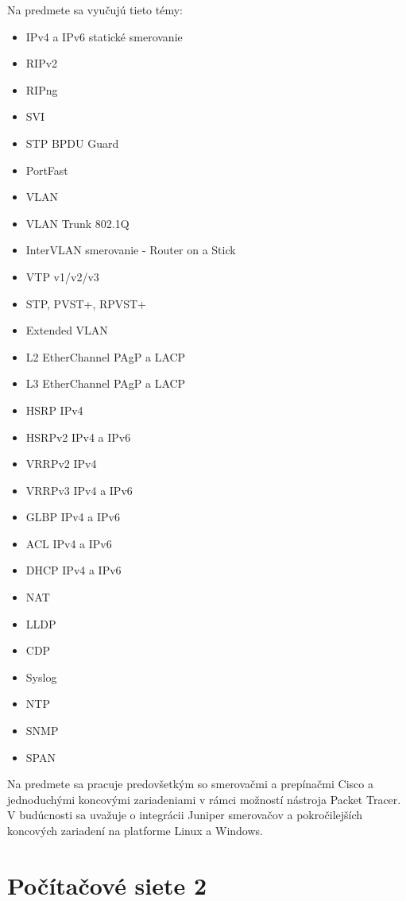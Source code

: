 Na predmete sa vyučujú tieto témy:

\begin{itemize}[noitemsep]
    \item IPv4 a IPv6 statické smerovanie
    \item RIPv2
    \item RIPng
    \item SVI
    \item STP BPDU Guard
    \item PortFast
    \item VLAN
    \item VLAN Trunk 802.1Q
    \item InterVLAN smerovanie - Router on a Stick
    \item VTP v1/v2/v3
    \item STP, PVST+, RPVST+
    \item Extended VLAN
    \item L2 EtherChannel PAgP a LACP
    \item L3 EtherChannel PAgP a LACP
    \item HSRP IPv4 
    \item HSRPv2 IPv4 a IPv6 
    \item VRRPv2 IPv4 
    \item VRRPv3 IPv4 a IPv6 
    \item GLBP IPv4 a IPv6 
    \item ACL IPv4 a IPv6 
    \item DHCP IPv4 a IPv6 
    \item NAT
    \item LLDP
    \item CDP
    \item Syslog
    \item NTP
    \item SNMP
    \item SPAN
\end{itemize}

Na predmete sa pracuje predovšetkým so smerovačmi a prepínačmi Cisco a jednoduchými koncovými zariadeniami v rámci možností nástroja Packet Tracer. V budúcnosti sa uvažuje o integrácii Juniper smerovačov a pokročilejších koncových zariadení na platforme Linux a Windows.




\section{Počítačové siete 2}

